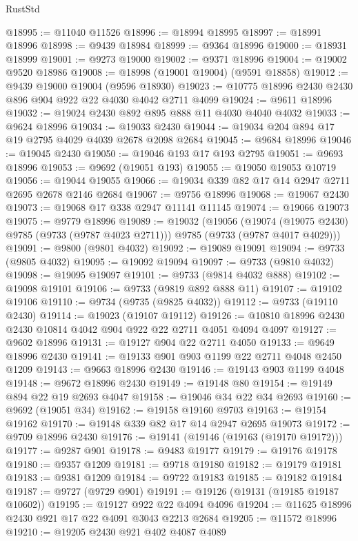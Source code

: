 \begin{lexlean}{RustStd}
\begin{coremodule}
@18995 := @11040 @11526
@18996 := @18994 @18995
@18997 := @18991 @18996
@18998 := @9439 @18984
@18999 := @9364 @18996
@19000 := @18931 @18999
@19001 := @9273 @19000
@19002 := @9371 @18996
@19004 := @19002 @9520 @18986
@19008 := @18998 (@19001 @19004) (@9591 @18858)
@19012 := @9439 @19000 @19004 (@9596 @18930)
@19023 := @10775 @18996 @2430 @2430 @896 @904 @922 @22 @4030 @4042 @2711 @4099
@19024 := @9611 @18996
@19032 := @19024 @2430 @892 @895 @888 @11 @4030 @4040 @4032
@19033 := @9624 @18996
@19034 := @19033 @2430
@19044 := @19034 @204 @894 @17 @19 @2795 @4029 @4039 @2678 @2098 @2684
@19045 := @9684 @18996
@19046 := @19045 @2430
@19050 := @19046 @193 @17 @193 @2795
@19051 := @9693 @18996
@19053 := @9692 (@19051 @193)
@19055 := @19050 @19053 @10719
@19056 := @19044 @19055
@19066 := @19034 @339 @82 @17 @14 @2947 @2711 @2695 @2678 @2146 @2684
@19067 := @9756 @18996
@19068 := @19067 @2430
@19073 := @19068 @17 @338 @2947 @11141 @11145
@19074 := @19066 @19073
@19075 := @9779 @18996
@19089 := @19032
    (@19056
      (@19074 (@19075 @2430) @9785 (@9733 (@9787 @4023 @2711)))
      @9785
      (@9733 (@9787 @4017 @4029)))
@19091 := @9800 (@9801 @4032)
@19092 := @19089 @19091
@19094 := @9733 (@9805 @4032)
@19095 := @19092 @19094
@19097 := @9733 (@9810 @4032)
@19098 := @19095 @19097
@19101 := @9733 (@9814 @4032 @888)
@19102 := @19098 @19101
@19106 := @9733 (@9819 @892 @888 @11)
@19107 := @19102 @19106
@19110 := @9734 (@9735 (@9825 @4032))
@19112 := @9733 (@19110 @2430)
@19114 := @19023 (@19107 @19112)
@19126 := @10810 @18996 @2430 @2430 @10814 @4042 @904 @922 @22 @2711 @4051 @4094 @4097
@19127 := @9602 @18996
@19131 := @19127 @904 @22 @2711 @4050
@19133 := @9649 @18996 @2430
@19141 := @19133 @901 @903 @1199 @22 @2711 @4048 @2450 @1209
@19143 := @9663 @18996 @2430
@19146 := @19143 @903 @1199 @4048
@19148 := @9672 @18996 @2430
@19149 := @19148 @80
@19154 := @19149 @894 @22 @19 @2693 @4047
@19158 := @19046 @34 @22 @34 @2693
@19160 := @9692 (@19051 @34)
@19162 := @19158 @19160 @9703
@19163 := @19154 @19162
@19170 := @19148 @339 @82 @17 @14 @2947 @2695 @19073
@19172 := @9709 @18996 @2430
@19176 := @19141 (@19146 (@19163 (@19170 @19172)))
@19177 := @9287 @901
@19178 := @9483 @19177
@19179 := @19176 @19178
@19180 := @9357 @1209
@19181 := @9718 @19180
@19182 := @19179 @19181
@19183 := @9381 @1209
@19184 := @9722 @19183
@19185 := @19182 @19184
@19187 := @9727 (@9729 @901)
@19191 := @19126 (@19131 (@19185 @19187 @10602))
@19195 := @19127 @922 @22 @4094 @4096
@19204 := @11625 @18996 @2430 @921 @17 @22 @4091 @3043 @2213 @2684
@19205 := @11572 @18996
@19210 := @19205 @2430 @921 @402 @4087 @4089

\end{coremodule}
\end{lexlean}
